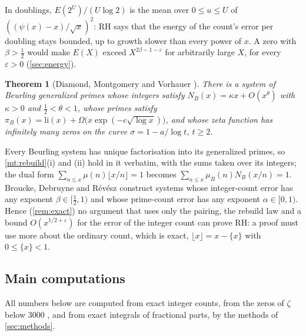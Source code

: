 \documentclass[11pt]{article}
\newtheorem{theorem}{Theorem}[section]
\theoremstyle{definition}\newtheorem{definition}[theorem]{Definition}
\theoremstyle{remark}\newtheorem{remark}[theorem]{Remark}
\newcommand{\fr}[1]{\{#1\}}
\begin{document}
In doublings, $E(2^U)/(U\log2)$ is the mean over $0\le u\le U$ of $((\psi(x)-x)/\sqrt x)^2$: RH says that the energy of the count's error per doubling stays bounded, up to growth slower than every power of $x$. A zero with $\beta>\frac12$ would make $E(X)$ exceed $X^{2\beta-1-\varepsilon}$ for arbitrarily large $X$, for every $\varepsilon>0$ (\cref{sec:energy}).

\begin{theorem}[Diamond, Montgomery and Vorhauer \cite{DMV}]\label{mt:beurling}
There is a system of Beurling generalized primes whose integers satisfy $N_B(x)=\kappa x+O(x^\theta)$ with $\kappa>0$ and $\frac12<\theta<1$, whose primes satisfy $\pi_B(x)=\mathrm{li}(x)+\Omega\bigl(x\exp(-c\sqrt{\log x})\bigr)$, and whose zeta function has infinitely many zeros on the curve $\sigma=1-a/\log t$, $t\ge2$.
\end{theorem}

Every Beurling system has unique factorisation into its generalized primes, so \cref{mt:rebuild}(i) and (ii) hold in it verbatim, with the sums taken over its integers; the dual form $\sum_{n\le x}\mu(n)\lfloor x/n\rfloor=1$ becomes $\sum_{n\le x}\mu_B(n)N_B(x/n)=1$. Broucke, Debruyne and R\'ev\'esz \cite{BDR} construct systems whose integer-count error has any exponent $\beta\in[\frac12,1)$ and whose prime-count error has any exponent $\alpha\in[0,1)$. Hence (\cref{rem:exact}) no argument that uses only the pairing, the rebuild law and a bound $O(x^{1/2+\varepsilon})$ for the error of the integer count can prove RH: a proof must use more about the ordinary count, which is exact, $\lfloor x\rfloor=x-\fr x$ with $0\le\fr x<1$.

\subsection{Main computations}

All numbers below are computed from exact integer counts, from the zeros of $\zeta$ below $3000$ \cite{S09}, and from exact integrals of fractional parts, by the methods of \cref{sec:methods}.
\end{document}
